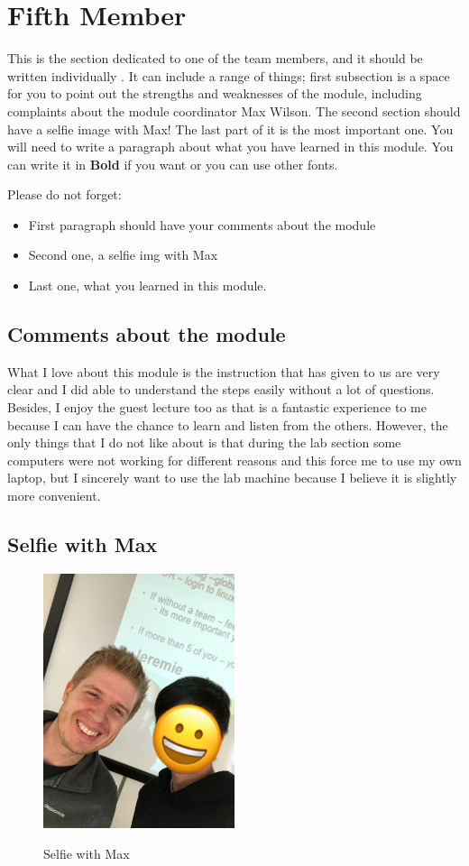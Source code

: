 \section{Fifth Member}
This is the section dedicated to one of the team members, and it should be written individually . It can include a range of things; first subsection is a space for you to point out the strengths and weaknesses of the module, including complaints about the module coordinator Max Wilson. The second section should have a selfie image with Max! The last part of it is the most important one. You will need to write a paragraph about what you have learned in this module. You can write it in \textbf{Bold} if you want or you can use other fonts. 

Please do not forget:
\begin{itemize}
	\item First paragraph should have your comments about the module
	\item Second one, a selfie img with Max
	\item Last one, what you learned in this module.
\end{itemize}

\subsection{Comments about the module}
What I love about this module is the instruction that has given to us are very clear and I did able to understand the steps easily without a lot of questions. Besides, I enjoy the guest lecture too as that is a fantastic experience to me because I can have the chance to learn and listen from the others. However, the only things that I do not like about is that during the lab section some computers were not working for different reasons and this force me to use my own laptop, but I sincerely want to use the lab machine because I believe it is slightly more convenient.

\subsection{Selfie with Max}

\begin{figure}[h]
\caption{Selfie with Max}
\centering
\includegraphics[width=0.5\textwidth]{Smileyface.jpg}
\label{fig:selfie}
\end{figure}

